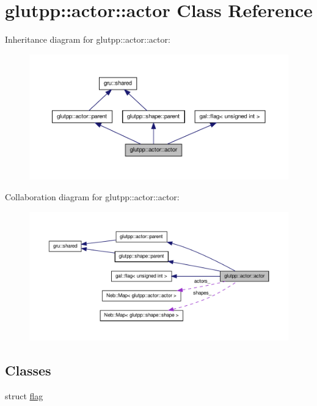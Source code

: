 \hypertarget{classglutpp_1_1actor_1_1actor}{\section{glutpp\-:\-:actor\-:\-:actor \-Class \-Reference}
\label{classglutpp_1_1actor_1_1actor}
}


\-Inheritance diagram for glutpp\-:\-:actor\-:\-:actor\-:\nopagebreak
\begin{figure}[H]
\begin{center}
\leavevmode
\includegraphics[width=350pt]{classglutpp_1_1actor_1_1actor__inherit__graph}
\end{center}
\end{figure}


\-Collaboration diagram for glutpp\-:\-:actor\-:\-:actor\-:\nopagebreak
\begin{figure}[H]
\begin{center}
\leavevmode
\includegraphics[width=350pt]{classglutpp_1_1actor_1_1actor__coll__graph}
\end{center}
\end{figure}
\subsection*{\-Classes}
\begin{DoxyCompactItemize}
\item 
struct \hyperlink{structglutpp_1_1actor_1_1actor_1_1flag}{flag}
\end{DoxyCompactItemize}
